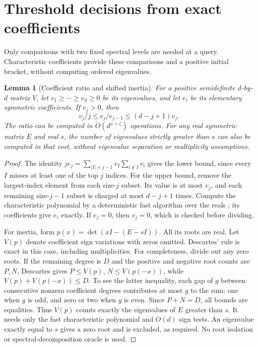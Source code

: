 \documentclass[11pt]{article}
\newtheorem{lemma}[theorem]{Lemma}
\newcommand{\tO}{\widetilde O}
\begin{document}
\section{Threshold decisions from exact coefficients}
Only comparisons with two fixed spectral levels are needed at a query.
Characteristic coefficients provide these comparisons and a positive
initial bracket, without computing ordered eigenvalues.

\begin{lemma}[Coefficient ratio and shifted inertia]\label{lem:coeff}
For a positive semidefinite \(d\)-by-\(d\) matrix \(V\), let
\(v_1\geq\cdots\geq v_d\geq0\) be its eigenvalues, and let \(e_i\)
be its elementary symmetric coefficients. If \(v_j>0\), then
\begin{equation}\label{eq:coeff}
 v_j/j\leq e_j/e_{j-1}\leq(d-j+1)v_j.
\end{equation}
The ratio can be computed in \(\tO(d^{\omega+\zeta})\) operations.
For any real symmetric matrix \(E\) and real \(s\), the number of
eigenvalues strictly greater than \(s\) can also be computed in that
cost, without eigenvalue separation or multiplicity assumptions.
\end{lemma}
\begin{proof}
The identity
\(j e_j=\sum_{|I|=j-1}v_I\sum_{i\notin I}v_i\) gives the lower
bound, since every \(I\) misses at least one of the top \(j\) indices.
For the upper bound, remove the largest-index element from each
size-\(j\) subset. Its value is at most \(v_j\), and each remaining
size-\(j-1\) subset is charged at most \(d-j+1\) times.
Compute the characteristic polynomial by a deterministic fast algorithm
over the reals \cite{np,npv}; its coefficients give \(e_i\) exactly.
If \(e_j=0\), then \(v_j=0\), which is checked before dividing.

For inertia, form \(p(x)=\det(xI-(E-sI))\). All its roots are real.
Let \(V(p)\) denote coefficient sign variations with zeros omitted.
Descartes' rule is exact in this case, including multiplicities.
For completeness, divide out any zero roots. If the remaining degree is
\(D\) and the positive and negative root counts are \(P,N\), Descartes
gives \(P\leq V(p)\), \(N\leq V(p(-x))\), while
\(V(p)+V(p(-x))\leq D\). To see the latter inequality, each gap of
\(g\) between consecutive nonzero coefficient degrees contributes at
most \(g\) to the sum: one when \(g\) is odd, and zero or two when
\(g\) is even. Since \(P+N=D\), all bounds are equalities.
Thus \(V(p)\) counts exactly the eigenvalues of \(E\) greater than \(s\).
It needs only the fast characteristic polynomial and \(O(d)\) sign tests.
An eigenvalue exactly equal to \(s\) gives a zero root and is excluded,
as required. No root isolation or spectral-decomposition oracle is used.
\end{proof}
\end{document}
